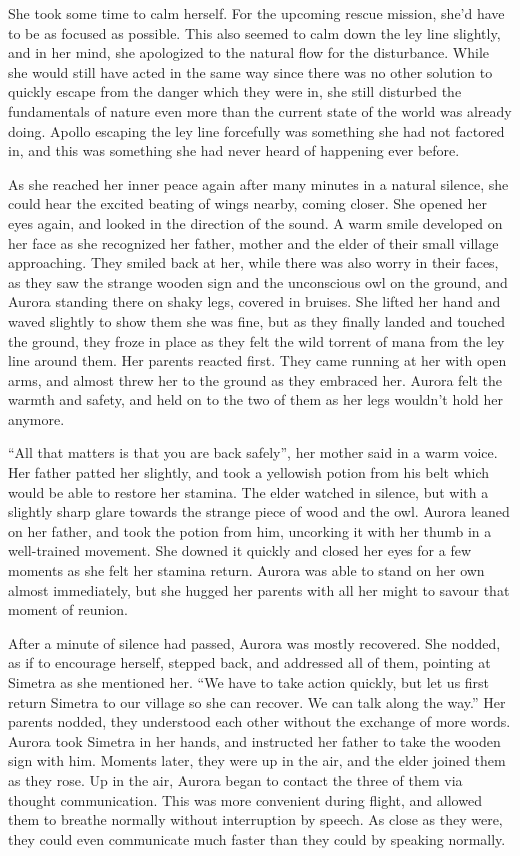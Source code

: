 She took some time to calm herself. For the upcoming rescue mission, she'd have to be as focused as possible. This also seemed to calm down the ley line slightly, and in her mind, she apologized to the natural flow for the disturbance. While she would still have acted in the same way since there was no other solution to quickly escape from the danger which they were in, she still disturbed the fundamentals of nature even more than the current state of the world was already doing. Apollo escaping the ley line forcefully was something she had not factored in, and this was something she had never heard of happening ever before.

As she reached her inner peace again after many minutes in a natural silence, she could hear the excited beating of wings nearby, coming closer. She opened her eyes again, and looked in the direction of the sound. A warm smile developed on her face as she recognized her father, mother and the elder of their small village approaching. They smiled back at her, while there was also worry in their faces, as they saw the strange wooden sign and the unconscious owl on the ground, and Aurora standing there on shaky legs, covered in bruises. She lifted her hand and waved slightly to show them she was fine, but as they finally landed and touched the ground, they froze in place as they felt the wild torrent of mana from the ley line around them. Her parents reacted first. They came running at her with open arms, and almost threw her to the ground as they embraced her. Aurora felt the warmth and safety, and held on to the two of them as her legs wouldn't hold her anymore. 

\enquote{All that matters is that you are back safely}, her mother said in a warm voice. Her father patted her slightly, and took a yellowish potion from his belt which would be able to restore her stamina. The elder watched in silence, but with a slightly sharp glare towards the strange piece of wood and the owl. Aurora leaned on her father, and took the potion from him, uncorking it with her thumb in a well-trained movement. She downed it quickly and closed her eyes for a few moments as she felt her stamina return. Aurora was able to stand on her own almost immediately, but she hugged her parents with all her might to savour that moment of reunion.

After a minute of silence had passed, Aurora was mostly recovered. She nodded, as if to encourage herself, stepped back, and addressed all of them, pointing at Simetra as she mentioned her. \enquote{We have to take action quickly, but let us first return Simetra to our village so she can recover. We can talk along the way.}
Her parents nodded, they understood each other without the exchange of more words. Aurora took Simetra in her hands, and instructed her father to take the wooden sign with him. Moments later, they were up in the air, and the elder joined them as they rose. Up in the air, Aurora began to contact the three of them via thought communication. This was more convenient during flight, and allowed them to breathe normally without interruption by speech. As close as they were, they could even communicate much faster than they could by speaking normally.

